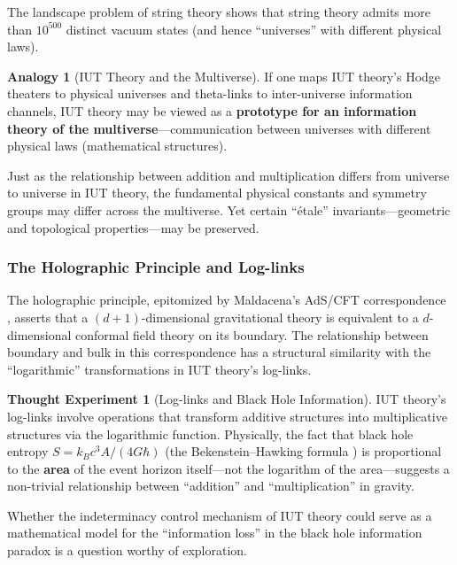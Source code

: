 \documentclass[12pt,a4paper]{article}
\theoremstyle{definition}
\newtheorem{analogy}[definition]{Analogy}
\newtheorem{thought}[definition]{Thought Experiment}
\begin{document}
The landscape problem of string theory \cite{Susskind2003, Bousso2000} shows that string theory admits more than $10^{500}$ distinct vacuum states (and hence ``universes'' with different physical laws).

\begin{analogy}[IUT Theory and the Multiverse]
If one maps IUT theory's Hodge theaters to physical universes and theta-links to inter-universe information channels, IUT theory may be viewed as a \textbf{prototype for an information theory of the multiverse}---communication between universes with different physical laws (mathematical structures).

Just as the relationship between addition and multiplication differs from universe to universe in IUT theory, the fundamental physical constants and symmetry groups may differ across the multiverse. Yet certain ``\'etale'' invariants---geometric and topological properties---may be preserved.
\end{analogy}

\subsubsection{The Holographic Principle and Log-links}

The holographic principle, epitomized by Maldacena's AdS/CFT correspondence \cite{Maldacena1998}, asserts that a $(d+1)$-dimensional gravitational theory is equivalent to a $d$-dimensional conformal field theory on its boundary. The relationship between boundary and bulk in this correspondence has a structural similarity with the ``logarithmic'' transformations in IUT theory's log-links.

\begin{thought}[Log-links and Black Hole Information]
IUT theory's log-links involve operations that transform additive structures into multiplicative structures via the logarithmic function. Physically, the fact that black hole entropy $S = k_B c^3 A / (4G\hbar)$ (the Bekenstein--Hawking formula \cite{Bekenstein1973, Hawking1975}) is proportional to the \textbf{area} of the event horizon itself---not the logarithm of the area---suggests a non-trivial relationship between ``addition'' and ``multiplication'' in gravity.

Whether the indeterminacy control mechanism of IUT theory could serve as a mathematical model for the ``information loss'' in the black hole information paradox is a question worthy of exploration.
\end{thought}
\end{document}
